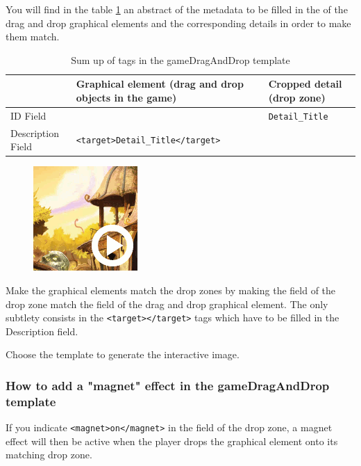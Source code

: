 You will find in the table \ref{tag2_sumup} an abstract of the metadata to be filled in the  
of the drag and drop graphical elements and the corresponding details in order to make them match.

\begin{table}
\begin{tabular}{|p{}|p{2.5in}|p{1.5in}|}
\hline
 & Graphical element (drag and drop objects in the game) & Cropped detail (drop zone)\\
\hline
ID Field & & \verb|Detail_Title|\\
\hline
Description Field & \verb|<target>Detail_Title</target>| & \\
\hline
\end{tabular}
\caption{Sum up of tags in the gameDragAndDrop template}
\label{tag2_sumup}
\end{table}

\begin{figure}
  \centering
  \includegraphics[scale=0.7]{./images/gameDragAndDrop} 
\end{figure}


Make the graphical elements match the drop zones by 
making the  field of the drop zone match
the  field of the drag and drop graphical element. 
The only subtlety consists in the  \verb|<target></target>| tags which have to be filled in the \chemin
{Description} field.

Choose the template  to generate the interactive image.



\subsubsection{How to add a "magnet" effect in the gameDragAndDrop template}

If you indicate \verb|<magnet>on</magnet>| in the  field of the drop zone, a magnet effect will then be active when the player drops the 
graphical element onto its matching drop zone.

